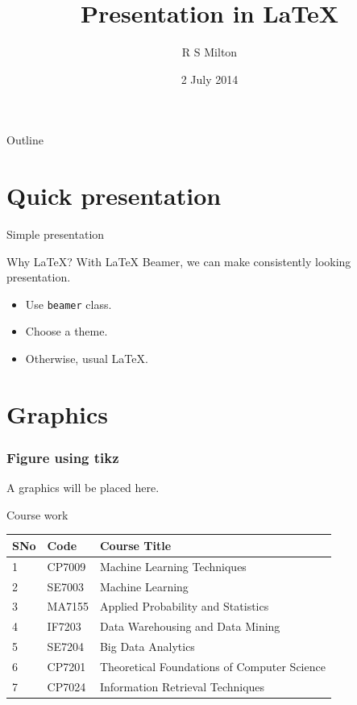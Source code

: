 \documentclass[11pt]{beamer}
\title{Presentation in LaTeX}
\author{R S Milton}
\institute{
  Department of Computer Science\\
  SSN College of Engineering
}
\date{2 July 2014}
\begin{document}
\begin{frame}
  \titlepage
\end{frame}

\begin{frame}{Outline}
  \tableofcontents
\end{frame}


\section{Quick presentation}

\begin{frame}{Simple presentation}
  \begin{block}{Why LaTeX?}
    With LaTeX Beamer, we can make consistently looking presentation.
  \end{block}
  \begin{itemize}
  \item Use \texttt{beamer} class.
  \item Choose a theme.
  \item Otherwise, usual LaTeX.
  \end{itemize}
\end{frame}


\section{Graphics}
\begin{frame}
  \frametitle{Figure using tikz}
  \begin{center}
    A graphics will be placed here.
  \end{center}
\end{frame}


\begin{frame}{Course work}

  \begin{tabular}{lll}
    SNo & Code & Course Title\\\hline
    1 & CP7009 & Machine Learning Techniques\\
    2 & SE7003 & Machine Learning\\
    3 & MA7155 & Applied Probability and Statistics \\    
    4 & IF7203 & Data Warehousing and Data Mining \\
    5 & SE7204 & Big Data Analytics\\
    6 & CP7201 & Theoretical Foundations  of Computer Science\\
    7 & CP7024 & Information Retrieval Techniques \\
  \end{tabular} 
\end{frame}
\end{document}

